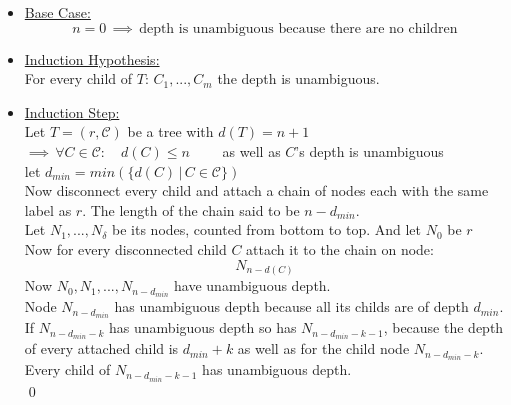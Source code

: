 \documentclass[a4paper,12pt]{article}
\begin{document}
	\begin{itemize}
		\item \underline{Base Case:}
			\[n=0 \,\implies \, \text{depth is unambiguous because there are no children}\]
		\item \underline{Induction Hypothesis:}\\
			For every child of $T$: $C_1,...,C_m$ the depth is unambiguous.
		\item \underline{Induction Step:}\\
		Let $T=(r,\mathcal{C})$ be a tree with $d(T) = n + 1$\\
		$\implies \,\forall C \in \mathcal{C}:\quad d(C)\leq n\qquad $ as well as $C$'s depth is unambiguous\\
		let $d_{min} = min\left(\{d(C)\, \vert \, C\in\mathcal{C}\}\right)$\\
		Now disconnect every child and attach a chain of nodes each with the same label as $r$. The length of the chain said to be $n - d_{min}$.\\
		Let $N_1,...,N_\delta$ be its nodes, counted from bottom to top. And let $N_0$ be $r$\\
		Now for every disconnected child $C$ attach it to the chain on node:
		\[N_{n - d(C)}\]
		Now $N_0,N_1,...,N_{n-d_{min}}$ have unambiguous depth.\\
		Node $N_{n-d_{min}}$ has unambiguous depth because all its childs are of depth $d_{min}$.\\
		If $N_{n-d_{min} - k }$ has unambiguous depth so has $N_{n- d_{min} - k - 1}$, because the depth of every attached child is $d_{min} + k$ as well as for the child node $N_{n-d_{min} - k}$. Every child of $N_{n- d_{min} - k - 1}$ has unambiguous depth. \\\qed
	\end{itemize}
\end{document}
